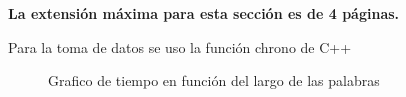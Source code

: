 \begin{mdframed}
    \textbf{La extensión máxima para esta sección es de 4 páginas.}
\end{mdframed}

Para la toma de datos se uso la función chrono de C++

\begin{figure}[H]
    \centering
    
    \caption{Grafico de tiempo en función del largo de las palabras}
    \label{fig:scatterplot_1}
\end{figure}


